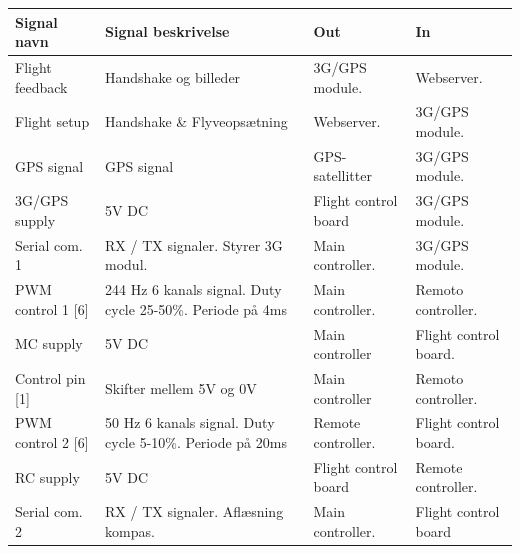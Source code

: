 \begin{table}[H]
	\centering
		\begin{tabular}	{|p{3.1 cm}|p{5.2 cm}|p{2.3 cm}|p{2.3 cm}|}  
								
		\hline
			\textbf{Signal navn} 	& \textbf{Signal beskrivelse}		& \textbf{Out} 		& \textbf{In}     \\ \hline
			Flight feedback		& Handshake og billeder				& 3G/GPS module.				& Webserver.	\\ \hline
			Flight setup		& Handshake \& Flyveopsætning  		& Webserver.			& 3G/GPS module.	\\ \hline
			GPS signal	 		& GPS signal						& GPS-satellitter		& 3G/GPS module.	\\ \hline			
			3G/GPS supply		& 5V DC							 	& Flight control board	& 3G/GPS module.    \\ \hline
			Serial com. 1		& RX / TX signaler. \newline Styrer 3G modul.& Main \newline controller. 		& 3G/GPS module.    \\ \hline
			
			
			PWM control 1 [6]	& 244 Hz 6 kanals signal. Duty \newline cycle 25-50\%. Periode på 4ms	& Main \newline controller.	& Remoto \newline controller.	\\ \hline
			MC supply		& 5V DC							 	& Main \newline controller	& Flight control board.    \\ \hline
			Control pin [1]		& Skifter mellem 5V og 0V							 	& Main \newline controller	& Remoto \newline  controller.    \\ \hline
			
			PWM control 2 [6]	& 50 Hz 6 kanals signal. Duty \newline cycle 5-10\%. Periode på 20ms	& Remote \newline controller.	& Flight control board.	\\ \hline		RC supply			& 5V DC							 	& Flight control board	& Remote \newline controller.    \\ \hline
			Serial com. 2		& RX / TX signaler. \newline Aflæsning kompas. & Main \newline controller.	& Flight control board	\\ \hline 	
			

\end{tabular}
\end{table}
